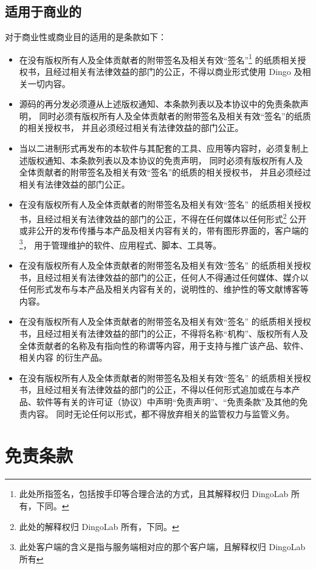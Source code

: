   \subsection{适用于商业的}
  对于商业性或商业目的适用的是条款如下：
  \begin{itemize}
    \item 在没有版权所有人及全体贡献者的附带签名及相关有效“签名”\footnote{此处所指签名，包括按手印等合理合法的方式，且其解释权归 DingoLab 所有，下同。}
      的纸质相关授权书，且经过相关有法律效益的部门的公正，不得以商业形式使用 Dingo 及相关一切内容。
    \item 源码的再分发必须遵从上述版权通知、本条款列表以及本协议中的免责条款声明，
      同时必须有版权所有人及全体贡献者的附带签名及相关有效“签名”的纸质的相关授权书，
      并且必须经过相关有法律效益的部门公正。
    \item 当以二进制形式再发布的本软件与其配套的工具、应用等内容时，必须复制上述版权通知、本条款列表以及本协议的免责声明，
      同时必须有版权所有人及全体贡献者的附带签名及相关有效“签名”的纸质的相关授权书，
      并且必须经过相关有法律效益的部门公正。
    \item 在没有版权所有人及全体贡献者的附带签名及相关有效“签名”
      的纸质相关授权书，且经过相关有法律效益的部门的公正，不得在任何媒体以任何形式\footnote{此处的解释权归 DingoLab 所有，下同。}
      公开或非公开的发布传播与本产品及相关内容有关的，带有图形界面的，客户端的\footnote{此处客户端的含义是指与服务端相对应的那个客户端，且解释权归 DingoLab 所有}，
      用于管理维护的软件、应用程式、脚本、工具等。
    \item 在没有版权所有人及全体贡献者的附带签名及相关有效“签名”
      的纸质相关授权书，且经过相关有法律效益的部门的公正，任何人不得通过任何媒体、媒介以任何形式发布与本产品及相关内容有关的，说明性的、维护性的等文献博客等内容。
    \item 在没有版权所有人及全体贡献者的附带签名及相关有效“签名”
      的纸质相关授权书，且经过相关有法律效益的部门的公正，不得将名称“机构”、版权所有人及全体贡献者的名称及有指向性的称谓等内容，用于支持与推广该产品、软件、相关内容
      的衍生产品。
    \item 在没有版权所有人及全体贡献者的附带签名及相关有效“签名”
      的纸质相关授权书，且经过相关有法律效益的部门的公正，不得以任何形式追加或在与本产品、软件等有关的许可证（协议）中声明“免责声明”、“免责条款”及其他的免责内容。
      同时无论任何以形式，都不得放弃相关的监管权力与监管义务。
  \end{itemize}

  \section{免责条款}
